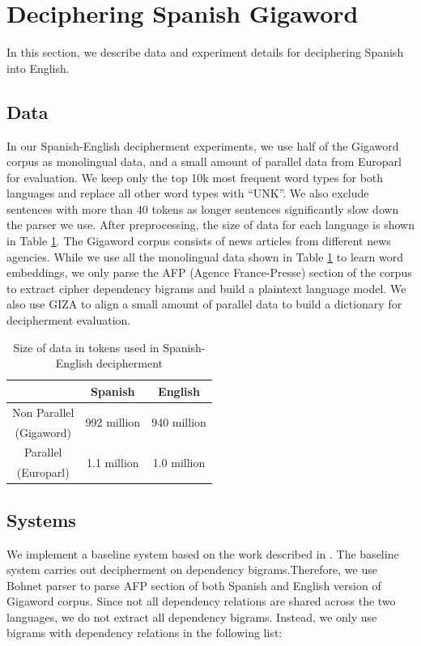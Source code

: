 \section{Deciphering Spanish Gigaword}
\label{decipher_spanish}
In this section, we describe data and experiment details for deciphering Spanish into English.

\subsection{Data}

In our Spanish-English decipherment experiments, we use half of the Gigaword corpus as monolingual data, and a small amount of parallel data from Europarl for evaluation. We keep only the top 10k most frequent word types for both languages and replace all other word types with ``UNK''.  We also exclude sentences with more than 40 tokens as longer sentences significantly slow down the parser we use. After preprocessing, the size of data for each language is shown in Table \ref{es-en-data}. The Gigaword corpus consists of news articles from different news agencies.  While we use all the monolingual data shown in Table \ref{es-en-data} to learn word embeddings, we only parse the AFP (Agence France-Presse) section of the corpus to extract cipher dependency bigrams and build a plaintext language model. We also use GIZA\cite{GIZA} to align a small amount of parallel data to build a dictionary for decipherment evaluation.

 \begin{table}
 \begin{center}
 \begin{tabular}{ |c|c|c| } \hline
             & Spanish & English \\ \hline
Non Parallel & \multirow{2}{*}{992 million} & \multirow{2}{*}{940 million} \\ 
(Gigaword) & &  \\ \hline
Parallel & \multirow{2}{*}{1.1 million} & \multirow{2}{*}{1.0 million} \\
(Europarl) & &  \\ \hline
 \end{tabular}
 \caption{Size of data in tokens used in Spanish-English decipherment}
 \label{es-en-data}
 \end{center}
 \end{table}

\subsection{Systems}
We implement a baseline system based on the work described in . The baseline system carries out decipherment on dependency bigrams.Therefore, we use Bohnet parser \cite{bohnet:2010:PAPERS} to parse AFP section of both Spanish and English version of Gigaword corpus. Since not all dependency relations are shared across the two languages, we do not extract all dependency bigrams. Instead, we only use bigrams with dependency relations in the following list: 

